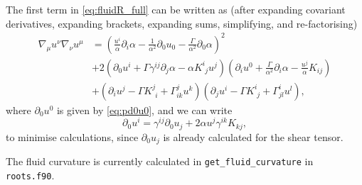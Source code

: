 \documentclass[a4paper]{article}
\newcommand{\ph}{\phantom}
\newcommand{\alp}{\alpha}
\newcommand{\Gam}{\Gamma}
\newcommand{\gam}{\gamma}
\newcommand{\pd}{\partial}
\begin{document}
The first term in \eqref{eq:fluidR_full} can be written as (after expanding covariant derivatives, expanding brackets, expanding sums, simplifying, and re-factorising)
\begin{equation}
	\begin{aligned}
	\nabla_\mu u^\nu \nabla_\nu u^\mu &= \left( \frac{u^i}{\alp} \pd_i \alp - \frac{1}{\alp^2}\pd_0 u_0 - \frac{\Gam}{\alp^2} \pd_0 \alp \right)^2  \\
		&+ 2 \left(  \pd_0 u^i + \Gam \gam^{ij} \pd_j \alp - \alp K^i_{\ph{i}j} u^j \right) \left( \pd_i u^0 + \frac{\Gam}{\alp^2} \pd_i \alp - \frac{u^j}{\alp} K_{ij} \right) \\
		&+ \left( \pd_i u^j - \Gam K^j_{\ph{j}i} + \Gam^j_{ik} u^k \right) \left( \pd_j u^i - \Gam K^i_{\ph{i}j} + \Gam^i_{jl}u^l\right),
	\end{aligned}
\end{equation}
where $\pd_0 u^0$ is given by \eqref{eq:pd0u0}, and we can write
\begin{equation}\label{eq:pd0uUi}
	\pd_0 u^i = \gam^{ij} \pd_0 u_j + 2 \alp u^j \gam^{ik} K_{kj},
\end{equation}
to minimise calculations, since $\pd_0 u_j$ is already calculated for the shear tensor. 

The fluid curvature is currently calculated in \texttt{get\_fluid\_curvature} in \texttt{roots.f90}.
		


\end{document}
